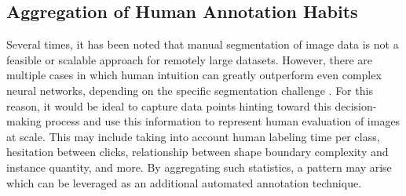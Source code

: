 \subsection{Aggregation of Human Annotation Habits}
Several times, it has been noted that manual segmentation of image data is not a feasible or scalable approach for remotely large datasets. However, there are multiple cases in which human intuition can greatly outperform even complex neural networks, depending on the specific segmentation challenge \cite{Russakovsky_humanCollabAnnotation2015}. For this reason, it would be ideal to capture data points hinting toward this decision-making process and use this information to represent human evaluation of images at scale. This may include taking into account human labeling time per class, hesitation between clicks, relationship between shape boundary complexity and instance quantity, and more. By aggregating such statistics, a pattern may arise which can be leveraged as an additional automated annotation technique.